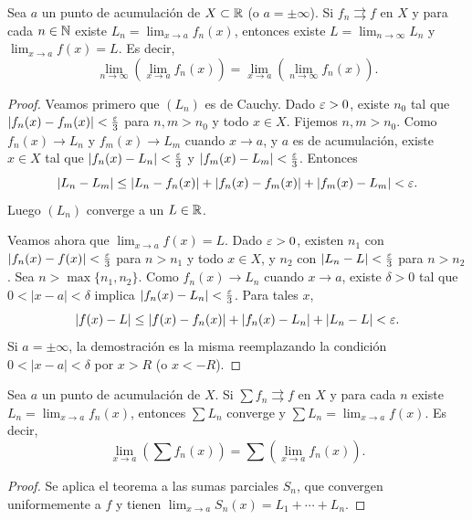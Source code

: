 \begin{theorem}
  Sea \(a\) un punto de acumulación de \(X \subset \mathbb{R}\) (o \(a = \pm\infty\)). Si \(f_n \rightrightarrows f\) en \(X\) y para cada \(n \in \mathbb{N}\) existe \(L_n = \lim_{x \to a} f_n(x)\), entonces existe \(L = \lim_{n \to \infty} L_n\) y \(\lim_{x \to a} f(x) = L\). Es decir,
  \[
    \lim_{n \to \infty} \left( \lim_{x \to a} f_n(x) \right) = \lim_{x \to a} \left( \lim_{n \to \infty} f_n(x) \right).
  \]
\end{theorem}

\begin{proof}
  Veamos primero que \({(L_n)}\) es de Cauchy. Dado \(\varepsilon > 0\), existe \(n_0\) tal que \(|f_n(x) - f_m(x)| < \frac{\varepsilon}{3}\) para \(n, m > n_0\) y todo \(x \in X\). Fijemos \(n, m > n_0\). Como \(f_n(x) \to L_n\) y \(f_m(x) \to L_m\) cuando \(x \to a\), y \(a\) es de acumulación, existe \(x \in X\) tal que \(|f_n(x) - L_n| < \frac{\varepsilon}{3}\) y \(|f_m(x) - L_m| < \frac{\varepsilon}{3}\). Entonces
  \[
    |L_n - L_m| \leq |L_n - f_n(x)| + |f_n(x) - f_m(x)| + |f_m(x) - L_m| < \varepsilon.
  \]
  Luego \({(L_n)}\) converge a un \(L \in \mathbb{R}\).

  Veamos ahora que \(\lim_{x \to a} f(x) = L\). Dado \(\varepsilon > 0\), existen \(n_1\) con \(|f_n(x) - f(x)| < \frac{\varepsilon}{3}\) para \(n > n_1\) y todo \(x \in X\), y \(n_2\) con \(|L_n - L| < \frac{\varepsilon}{3}\) para \(n > n_2\). Sea \(n > \max\{n_1, n_2\}\). Como \(f_n(x) \to L_n\) cuando \(x \to a\), existe \(\delta > 0\) tal que \(0 < |x - a| < \delta\) implica \(|f_n(x) - L_n| < \frac{\varepsilon}{3}\). Para tales \(x\),
  \[
    |f(x) - L| \leq |f(x) - f_n(x)| + |f_n(x) - L_n| + |L_n - L| < \varepsilon.
  \]
  Si \(a = \pm\infty\), la demostración es la misma reemplazando la condición \(0 < |x - a| < \delta\) por \(x > R\) (o \(x < -R\)).
\end{proof}

\begin{corollary}
  Sea \(a\) un punto de acumulación de \(X\). Si \(\sum f_n \rightrightarrows f\) en \(X\) y para cada \(n\) existe \(L_n = \lim_{x \to a} f_n(x)\), entonces \(\sum L_n\) converge y \(\sum L_n = \lim_{x \to a} f(x)\). Es decir,
  \[
    \lim_{x \to a} \left( \sum f_n(x) \right) = \sum \left( \lim_{x \to a} f_n(x) \right).
  \]
\end{corollary}

\begin{proof}
  Se aplica el teorema a las sumas parciales \(S_n\), que convergen uniformemente a \(f\) y tienen \(\lim_{x \to a} S_n(x) = L_1 + \cdots + L_n\).
\end{proof}

